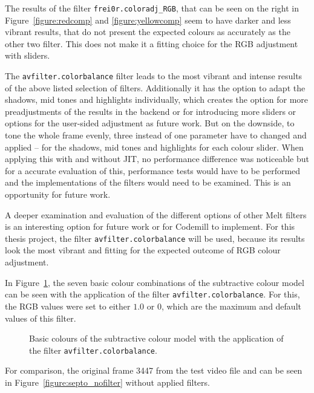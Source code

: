 \documentclass[../MasterThesis.tex]{subfiles}
\begin{document}
The results of the filter \texttt{frei0r.coloradj\_RGB}, that can be seen on the right in Figure~\ref{figure:redcomp} and \ref{figure:yellowcomp} seem to have darker and less vibrant results, that do not present the expected colours as accurately as the other two filter. This does not make it a fitting choice for the RGB adjustment with sliders.


The \texttt{avfilter.colorbalance} filter leads to the most vibrant and intense results of the above listed selection of filters. Additionally it has the option to adapt the shadows, mid tones and highlights individually, which creates the option for more preadjustments of the results in the backend or for introducing more sliders or options for the user-sided adjustment as future work.
But on the downside, to tone the whole frame evenly, three instead of one parameter have to changed and applied -- for the shadows, mid tones and highlights for each colour slider.
When applying this with and without JIT, no performance difference was noticeable but for a accurate evaluation of this, performance tests would have to be performed and the implementations of the filters would need to be examined. This is an opportunity for future work.

A deeper examination and evaluation of the different options of other Melt filters is an interesting option for future work or for Codemill to implement. For this thesis project, the filter \texttt{avfilter.colorbalance} will be used, because its results look the most vibrant and fitting for the expected outcome of RGB colour adjustment.

In Figure~\ref{figure:septopus}, the seven basic colour combinations of the subtractive colour model can be seen with the application of the filter \texttt{avfilter.colorbalance}. For this, the RGB values were set to either $1.0$ or $0$, which are the maximum and default values of this filter. 



\begin{figure}[H]
	\begin{center}
		\caption[Basic colours with the application of the filter \texttt{avfilter.colorbalance}.]{Basic colours of the subtractive colour model with the application of the filter \texttt{avfilter.colorbalance}.}
		\label{figure:septopus}
	\end{center}
\end{figure}

For comparison, the original frame 3447 from the test video file and can be seen in Figure~\ref{figure:septo_nofilter} without applied filters.
\end{document}
